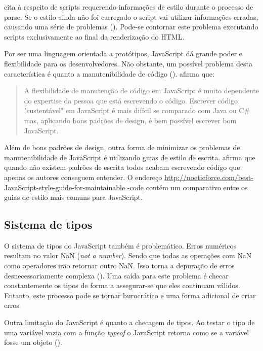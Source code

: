 \citet{howBrowsersWork} cita à respeito de scripts requerendo informações de
estilo durante o processo de parse. Se o estilo ainda não foi carregado
o script vai utilizar informações erradas, causando uma série de
problemas (). Pode-se
contornar este problema executando scripts exclusivamente ao final da
renderização do HTML.

Por ser uma linguagem orientada a protótipos, JavaScript dá grande
poder e flexibilidade para os desenvolvedores. Não obstante, um
possível problema desta característica é quanto a manutenibilidade de
código (). \citet{html5Tradeoffs} afirma que:

\begin{quote}
A flexibilidade de manutenção de código em JavaScript é muito
dependente do expertise da pessoa que está escrevendo o código.
Escrever código "sustentável" em JavaScript é mais difícil se
comparado com Java ou C\# mas, aplicando bons padrões de design, é bem
possível escrever bom JavaScript.
\end{quote}

Além de bons padrões de design, outra forma de minimizar
os problemas de manutenibilidade de JavaScript é utilizando
guias de estilo de escrita. \citet{jsStyleGuide} afirma que
quando não existem padrões de escrita todos acabam escrevendo
código que apenas os autores conseguem entender. O endereço
\url{http://noeticforce.com/best-JavaScript-style-guide-for-maintainable
-code} contém um comparativo entre os guias de estilo mais comuns para
JavaScript.

\subsection{Sistema de tipos}

O sistema de tipos do JavaScript também é problemático. Erros
numéricos resultam no valor NaN (\textit{not a number}). Sendo que
todas as operações com NaN como operadores irão retornar outro
NaN. Isso torna a depuração de erros desnecessariamente complexa
\autocite{html5mostwanted} (). Uma saída
para este problema é checar constantemente os tipos de forma a
assegurar-se que eles continuam válidos. Entanto, este processo
pode se tornar burocrático e uma forma adicional de criar erros.

Outra limitação do JavaScript é quanto a checagem de tipos. Ao
testar o tipo de uma variável vazia com a função \textit{typeof}
o JavaScript retorna como se a variável fosse um objeto
().

